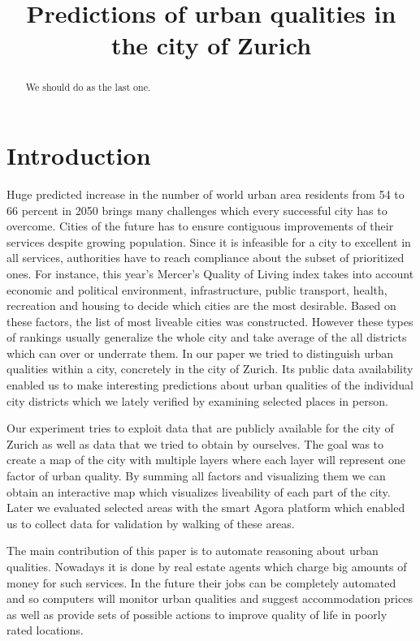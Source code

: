 \documentclass[letterpaper]{article}
\title{Predictions of urban qualities in the city of Zurich}
\begin{document}
%
\maketitle
%

\begin{abstract}
We should do as the last one.
\end{abstract}

\section{Introduction}\label{sec:intro}
Huge predicted increase in the number of world urban area residents from 54 to 66 percent in 2050 brings many challenges
which every successful city has to overcome. Cities of the future has to ensure contiguous improvements of their
services despite growing population. Since it is infeasible for a city to excellent in all services,
authorities have to reach compliance about the subset of prioritized ones. For instance, this year's Mercer's Quality of Living index
takes into account economic and political environment, infrastructure, public transport, health, recreation and housing
to decide which cities are the most desirable. Based on these factors, the list of most liveable cities was constructed.
However these types of rankings usually generalize the whole city and take average of the all districts which can
over or underrate them. In our paper we tried to distinguish urban qualities within a city, concretely in the city of Zurich.
Its public data availability enabled us to make interesting predictions about urban qualities of the individual city districts
which we lately verified by examining selected places in person.

\indent Our experiment tries to exploit data that are publicly available for the city of Zurich as well as data that we tried to obtain by ourselves.
The goal was to create a map of the city with multiple layers where each layer will represent one factor of urban quality. By summing all factors and
visualizing them we can obtain an interactive map which visualizes liveability of each part of the city. Later we evaluated selected areas with the smart
Agora platform which enabled us to collect data for validation by walking of these areas.

\indent The main contribution of this paper is to automate reasoning about urban qualities. Nowadays it is done by
real estate agents which charge big amounts of money for such services. In the future their jobs can be
completely automated and so computers will monitor urban qualities and suggest accommodation prices as well as
provide sets of possible actions to improve quality of life in poorly rated locations.
\end{document}
